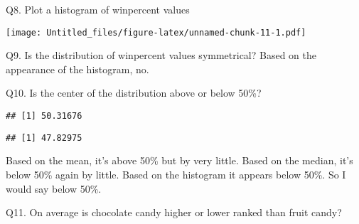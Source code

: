 \documentclass[
]{article}
\newenvironment{Shaded}{\begin{snugshade}}{\end{snugshade}}
\newcommand{\AttributeTok}[1]{\textcolor[rgb]{0.13,0.29,0.53}{#1}}
\newcommand{\FunctionTok}[1]{\textcolor[rgb]{0.13,0.29,0.53}{\textbf{#1}}}
\newcommand{\NormalTok}[1]{#1}
\newcommand{\SpecialCharTok}[1]{\textcolor[rgb]{0.81,0.36,0.00}{\textbf{#1}}}
\newcommand{\StringTok}[1]{\textcolor[rgb]{0.31,0.60,0.02}{#1}}
\begin{document}
Q8. Plot a histogram of winpercent values

\begin{Shaded}
\end{Shaded}

\texttt{[image: Untitled\_files/figure-latex/unnamed-chunk-11-1.pdf]}

Q9. Is the distribution of winpercent values symmetrical? Based on the
appearance of the histogram, no.

Q10. Is the center of the distribution above or below 50\%?

\begin{Shaded}
\end{Shaded}

\begin{verbatim}
## [1] 50.31676
\end{verbatim}

\begin{Shaded}
\end{Shaded}

\begin{verbatim}
## [1] 47.82975
\end{verbatim}

Based on the mean, it's above 50\% but by very little. Based on the
median, it's below 50\% again by little. Based on the histogram it
appears below 50\%. So I would say below 50\%.

Q11. On average is chocolate candy higher or lower ranked than fruit
candy?

\begin{Shaded}
\end{Shaded}
\end{document}
